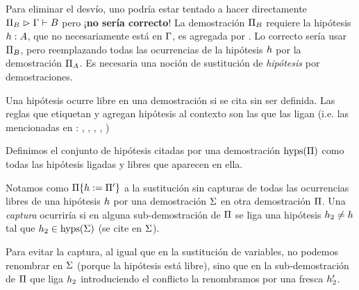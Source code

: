 Para eliminar el desvío, uno podría estar tentado a hacer directamente $\Pi_B \vartriangleright \Gamma \vdash B$ pero ¡\textbf{no sería correcto}! La demostración $\Pi_B$ requiere la hipótesis $h : A$, que no necesariamente está en $\Gamma$, es agregada por . Lo correcto sería usar $\Pi_B$, pero reemplazando todas las ocurrencias de la hipótesis $h$ por la demostración $\Pi_A$. Es necesaria una noción de sustitución de \textit{hipótesis} por demostraciones.

\begin{definition}
    Una hipótesis ocurre libre en una demostración si se cita sin ser definida. Las reglas que etiquetan y agregan hipótesis al contexto son las que las ligan (i.e. las mencionadas en : , , , , )
\end{definition}

\begin{definition}
    Definimos el conjunto de hipótesis citadas por una demostración $\textrm{hyps}(\Pi)$ como todas las hipótesis ligadas y libres que aparecen en ella.
\end{definition}

\begin{definition}
    Notamos como \(\Pi \{h := \Pi'\}\) a la sustitución sin capturas de todas las ocurrencias libres de una hipótesis $h$ por una demostración $\Sigma$ en otra demostración $\Pi$. Una \textit{captura} ocurriría si en alguna sub-demostración de $\Pi$ se liga una hipótesis $h_2 \neq h$ tal que $h_2 \in \textrm{hyps}(\Sigma)$ (se cite en $\Sigma$).
    
    Para evitar la captura, al igual que en la sustitución de variables, no podemos renombrar en $\Sigma$ (porque la hipótesis está libre), sino que en la sub-demostración de $\Pi$ que liga $h_2$ introduciendo el conflicto la renombramos por una fresca $h_2'$.
\end{definition}


